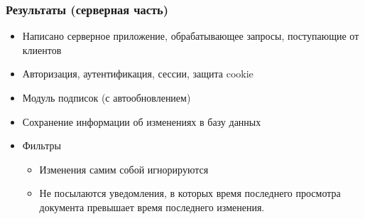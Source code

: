 \documentclass[10pt,pdf,hyperref={unicode}]{beamer}
\begin{document}
    \begin{frame}\frametitle{Результаты (серверная часть)}
        \begin{itemize}%
            \item	Написано серверное приложение, обрабатывающее запросы, поступающие от клиентов            
            \item	Авторизация, аутентификация, сессии, защита cookie
	        \pause
            \item	Модуль подписок (с автообновлением)
            \item	Сохранение информации об изменениях в базу данных
	        \pause
            \item	Фильтры
            \begin{itemize}
                \item Изменения самим собой игнорируются
                \item Не посылаются уведомления, в которых время последнего просмотра документа превышает время последнего изменения.
            \end{itemize}

        \end{itemize}
    \end{frame}
    
\end{document}

